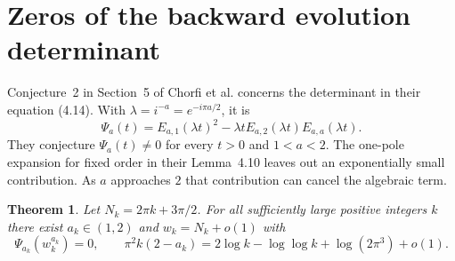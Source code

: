 \documentclass[11pt,a4paper]{article}
\newtheorem{theorem}{Theorem}[section]
\numberwithin{equation}{section}
\begin{document}
\section{Zeros of the backward evolution determinant}
\label{sec:wronskian}
Conjecture~2 in Section~5 of Chorfi et al. concerns the determinant
in their equation (4.14). With $\lambda=i^{-a}=e^{-i\pi a/2}$, it is
\[
 \Psi_a(t)=E_{a,1}(\lambda t)^2
 -\lambda t E_{a,2}(\lambda t) E_{a,a}(\lambda t).
\]
They conjecture $\Psi_a(t)\ne0$ for every $t>0$ and $1<a<2$.
The one-pole expansion for fixed order in their Lemma~4.10 leaves
out an exponentially small contribution. As $a$ approaches $2$ that
contribution can cancel the algebraic term.
\begin{theorem}\label{th:wronskian}
Let $N_k=2\pi k+3\pi/2$. For all sufficiently large positive integers
$k$ there exist $a_k\in(1,2)$ and $w_k=N_k+o(1)$ with
\[
 \Psi_{a_k}(w_k^{a_k})=0,\qquad
 \pi^2 k(2-a_k)=2\log k-\log\log k+\log(2\pi^3)+o(1).
\]
\end{theorem}
\end{document}
